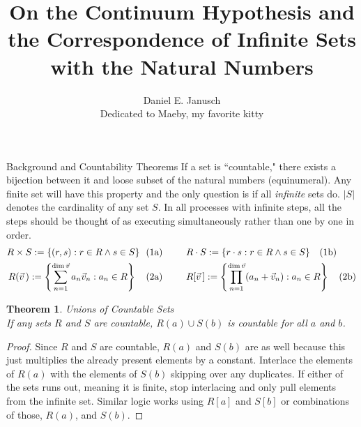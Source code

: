 \documentclass[12pt]{article}
\newtheorem{thm}{Theorem}
\begin{document}
\title{On the Continuum Hypothesis and the Correspondence of Infinite Sets with the Natural Numbers}
\author{Daniel E. Janusch\\Dedicated to Maeby, my favorite kitty}
\maketitle

\begin{section}{Background and Countability Theorems}\label{sec:background}
	If a set is ``countable," there exists a bijection between it and loose subset
	of the natural numbers (equinumeral). Any finite set will have this property and
	the only question is if all \emph{infinite} sets do. $|S|$ denotes the cardinality
	of any set $S$. In all processes with infinite steps, all the steps should be
	thought of as executing simultaneously rather than one by one in order.\vspace{-1em}\\
	\begin{align}
		R\times S :=\{(r,s):r\in R\land s\in S\}~~(1 & \text a)
		\hspace{2.5em}
		R\cdot S :=\{r\cdot s:r\in R\land s\in S\}~~~(1\text b)
		\\
		R(\vec v\,):=\left\{\sum_{n=1}^{\dim\vec v}a_n\vec v_n:a_n\in R\right\}~~~(2 & \text a)
		\hspace{2.5em}
		R[\vec v\,]:=\left\{\prod_{n=1}^{\dim\vec v}(a_n+\vec v_n):a_n\in R\right\}~~~(2\text b)
	\end{align}

	\begin{thm}\label{thm:finite unions}
		\emph{Unions of Countable Sets}\\
		\indent\emph{If any sets $R$ and $S$ are countable, $R(a)\cup S(b)$ is countable
		for all $a$ and $b$.}
	\end{thm}\begin{proof}
		Since $R$ and $S$ are countable, $R(a)$ and $S(b)$ are as well because this just
		multiplies the already present elements by a constant. Interlace the elements of
		$R(a)$ with the elements of $S(b)$ skipping over any duplicates. If either of the
		sets runs out, meaning it is finite, stop interlacing and only pull elements from
		the infinite set. Similar logic works using $R[a]$ and $S[b]$ or combinations of
		those, $R(a)$, and $S(b)$.
	\end{proof}


\end{section}
\end{document}
